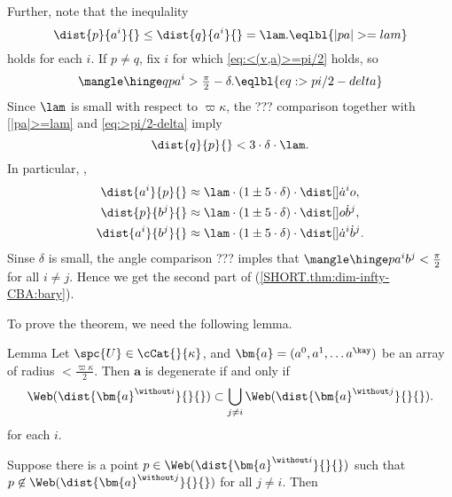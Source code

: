 Further, note that the inequlality
$$\dist{p}{a^i}{}\le \dist{q}{a^i}{}=\lam.
\eqlbl{|pa|>=lam}$$
holds for each $i$.
If $p\not= q$, fix $i$ for which \ref{eq:<(v,a)>=pi/2} holds,
so 
$$\mangle\hinge q p {a^i}>\tfrac\pi2-\delta.
\eqlbl{eq:>pi/2-delta}$$
Since $\lam$ is small with respect to $\varpi\kappa$,
the ??? comparison together with \ref{|pa|>=lam} and \ref{eq:>pi/2-delta} imply 
$$\dist{q}{p}{}<3\cdot\delta\cdot\lam.$$
In particular, ,
\begin{align*}
\dist{a^i}{p}{}&\approx \lam\cdot(1\pm5\cdot\delta)\cdot\dist[{{}}]{\dot a^i}{o}{},
\\
\dist{p}{b^j}{}&\approx \lam\cdot(1\pm5\cdot\delta)\cdot\dist[{{}}]{o}{\dot b^j}{},
\\
\dist{a^i}{b^j}{}&\approx \lam\cdot(1\pm5\cdot\delta)\cdot\dist[{{}}]{\dot a^i}{\dot b^j}{}.
\end{align*}
Sinse $\delta$ is small, the angle comparison ??? imples that
$\mangle \hinge p{a^i}{b^j}<\tfrac{\pi}{2}{}$
for all $i\not=j$.
Hence we get the second part of (\ref{SHORT.thm:dim-infty-CBA:bary}).





















To prove the theorem, we need the following lemma.




\begin{thm}{Lemma}\label{lem:nondeg-test-with-faces}
Let $\spc{U}\in\cCat{}{\kappa}$,
and $\bm{a}=(a^0,a^1,\dots a^\kay)$ be an array of radius $<\tfrac{\varpi\kappa}2$.
Then $\bm{a}$ is degenerate if and only if 
$$\Web({\dist{\bm{a}^{\without i}}{}{}})
\subset 
\bigcup_{j\not=i}
\Web({\dist{\bm{a}^{\without j}}{}{}}).$$
for each $i$.
\end{thm}

Suppose there is a point $p\in \Web({\dist{\bm{a}^{\without i}}{}{}})$ such that
$p\not\in \Web({\dist{\bm{a}^{\without j}}{}{}})$ for all $j\not=i$.
Then 
\qeds











